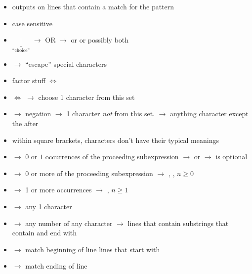 \begin{itemize}
    \item outputs on  lines that contain a match for the pattern
    \item case sensitive
    \item $ \underbrace{|}_{\text{``choice''}} $ $ \rightarrow $ OR
    \subitem {} $ \rightarrow $
     or  or possibly both
    \item \code{\textbackslash} $ \rightarrow $ ``escape'' special characters
    \item factor stuff
    \subitem {} $ \iff $ 
    \item {} $ \iff $  $ \rightarrow $ choose
    1 character from this set
    \item \code{\textasciicircum} $ \rightarrow $ negation
    \subitem {} $ \rightarrow $
    1 character \emph{not} from this set.
    \subitem {} $ \rightarrow $ anything character
    except the  after 
    \item within square brackets, characters don't have their typical
    meanings
    \item {} $ \rightarrow $ $ 0 $ or $ 1 $ occurrences of the
    proceeding subexpression
    \subitem {} $ \rightarrow $  or 
    \subitem {} $ \rightarrow $  is optional
    \item \code{*} $ \rightarrow $ 0 or more of the proceeding subexpression
    \subitem {} $ \rightarrow $ ,
    , $ n\ge 0 $
    \item \code{+} $ \rightarrow $ 1 or more occurrences
    \subitem {} $ \rightarrow $ 
    , $ n\ge 1 $
    \item {} $ \rightarrow $ any 1 character
    \item {} $ \rightarrow $ any number of any character
    \subitem {} $ \rightarrow $ lines that contain substrings
    that contain  and end with 
    \item \code{\textasciicircum} $ \rightarrow $ match beginning of line
    \subitem {} lines that start with 
    \item \code{\$} $ \rightarrow $ match ending of line

\end{itemize}
